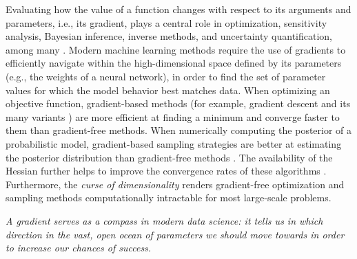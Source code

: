 Evaluating how the value of a function changes with respect to its arguments and parameters, i.e., its gradient, plays a central role in optimization, sensitivity analysis, Bayesian inference, inverse methods, and uncertainty quantification, among many \cite{Razavi.2021}. 
Modern machine learning methods require the use of gradients to efficiently navigate within the high-dimensional space defined by its parameters (e.g., the weights of a neural network), in order to find the set of parameter values for which the model behavior best matches data. 
When optimizing an objective function, gradient-based methods (for example, gradient descent and its many variants \cite{ruder2016overview-gradient-descent}) are more efficient at finding a minimum and converge faster to them than gradient-free methods.
When numerically computing the posterior of a probabilistic model, gradient-based sampling strategies are better at estimating the posterior distribution than gradient-free methods \cite{neal2011mcmc}. 
The availability of the Hessian further helps to improve the convergence rates of these algorithms \cite{BuiThanh:2012ul}.
Furthermore, the \textit{curse of dimensionality} renders gradient-free optimization and sampling methods computationally intractable for most large-scale problems.
\begin{displayquote}
\emph{A gradient serves as a compass in modern data science: it tells us in which direction in the vast, open ocean of parameters we should move towards in order to increase our chances of success.  }
\end{displayquote}

